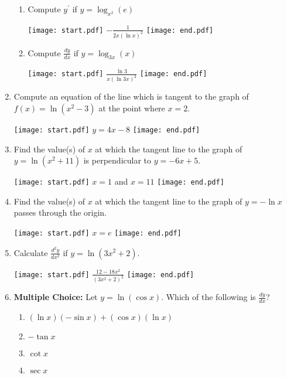 \documentclass[12pt]{article}
\begin{document}
\begin{enumerate}
\begin{enumerate}
\item Compute $y^{\prime}$ if  $y=\log_{x^2}{(e)}$

\texttt{[image: start.pdf]}
{{$-\frac{1}{2x(\ln{x})^2}$}}
\texttt{[image: end.pdf]}


\item Compute $\frac{dy}{dx}$ if $y = \log_{3x}{(x)}$ 

\texttt{[image: start.pdf]}
{{$\frac{\ln{3}}{x(\ln{3x})^2}$}}
\texttt{[image: end.pdf]}


\end{enumerate}

\item Compute an equation of the line which is tangent to the graph of $f(x)=\ln{(x^2-3)}$ at the point where $x=2$.

\texttt{[image: start.pdf]}
{{$y=4x-8$}}
\texttt{[image: end.pdf]}


\item Find the value(s) of $x$ at which the tangent line to the graph of $y=\ln{(x^2+11)}$  is perpendicular to $y=-6x+5$.

\texttt{[image: start.pdf]}
{{$x=1$ and $x=11$}}
\texttt{[image: end.pdf]}


\item Find the value(s) of $x$ at which the tangent line to the graph of $y=-\ln{x}$ passes through the origin.

\texttt{[image: start.pdf]}
{{$x=e$}}
\texttt{[image: end.pdf]}


\item Calculate $\frac{d^2y}{dx^2}$ if $y=\ln{(3x^2+2)}$.

\texttt{[image: start.pdf]}
{{$\frac{12-18x^2}{(3x^2+2)^2}$}}
\texttt{[image: end.pdf]}


\item {\bf Multiple Choice:} Let $y=\ln{(\cos{x})}$.  Which of the following is $\frac{dy}{dx}$?

\begin{enumerate}

\item $(\ln{x})(-\sin{x})+(\cos{x})(\ln{x})$

\item $-\tan{x}$

\item $\cot{x}$

\item $\sec{x}$


\end{enumerate}
\end{enumerate}
\end{document}
